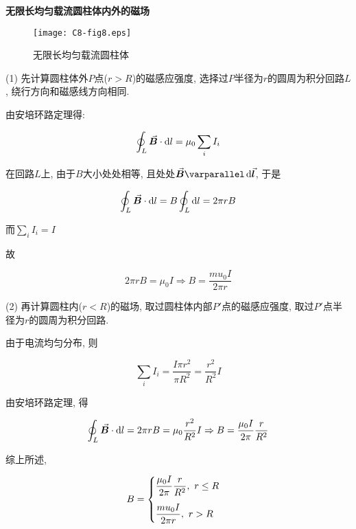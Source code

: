 \begin{example}
	\textbf{无限长均匀载流圆柱体内外的磁场}
	
	\begin{figure}[H]
		\centering
		\texttt{[image: C8-fig8.eps]}
		\caption{无限长均匀载流圆柱体}
	\end{figure}
	
	\begin{solution}
		
		(1) 先计算圆柱体外$P$点($r > R$)的磁感应强度, 选择过$P$半径为$r$的圆周为积分回路$L$, 绕行方向和磁感线方向相同. 
		
		由安培环路定理得: 
	    
	    \begin{equation*}
	    	\oint_{L} \va*{B} \cdot \dd{l} = \mu_0 \sum\limits_{i} I_i
	    \end{equation*}
	    
	    在回路$L$上, 由于$B$大小处处相等, 且处处$\va*{B} \varparallel \dd{\va*{l}}$, 于是
	    
	    \begin{equation*}
	    	\oint_{L} \va*{B} \cdot \dd{l} = B \oint_{L} \dd{l} = 2 \pi r B
	    \end{equation*}
	    
		而$\sum\limits_{i} I_i = I$
		
		故
		
		\begin{equation*}
			2 \pi r B = \mu_0 I \Rightarrow B = \dfrac{mu_0 I}{2 \pi r}
		\end{equation*}
		
		(2) 再计算圆柱内($r < R$)的磁场, 取过圆柱体内部$P'$点的磁感应强度, 取过$P'$点半径为$r$的圆周为积分回路. 
		
		由于电流均匀分布, 则
		
		\begin{equation*}
			\sum\limits_{i} I_i = \dfrac{I \pi r^2}{\pi R^2} = 
			\dfrac{r^2}{R^2} I
		\end{equation*}
		
		由安培环路定理, 得
		
		\begin{equation*}
			\oint_{L} \va*{B} \cdot \dd{l} = 2 \pi r B = \mu_0 \dfrac{r^2}{R^2} I \Rightarrow B = \dfrac{\mu_0 I}{2 \pi} \dfrac{r}{R^2}
		\end{equation*}
		
		综上所述, 
		
		\begin{equation*}
			B = \begin{cases}
				\dfrac{\mu_0 I}{2 \pi} \dfrac{r}{R^2},~r \leq R \vspace{2ex} \\
				\dfrac{mu_0 I}{2 \pi r},~r > R
			\end{cases}
		\end{equation*}
		

\end{solution}
\end{example}
